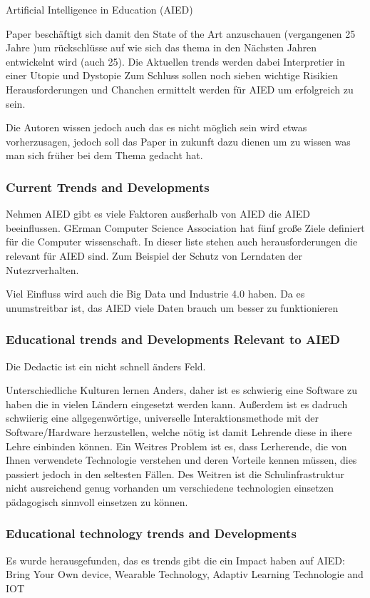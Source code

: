 Artificial Intelligence in Education (AIED)

Paper beschäftigt sich damit den State of the Art anzuschauen (vergangenen 25 Jahre )um rückschlüsse auf wie sich das
thema in den Nächsten Jahren entwickelnt wird (auch 25). Die Aktuellen trends werden dabei Interpretier in einer Utopie und Dystopie
Zum Schluss sollen noch sieben wichtige Risikien Herausforderungen und Chanchen ermittelt werden für AIED um erfolgreich zu sein.

Die Autoren wissen jedoch auch das es nicht möglich sein wird etwas vorherzusagen, jedoch soll das Paper in zukunft dazu dienen um zu wissen was man sich früher bei dem Thema gedacht hat.


\subsubsection*{Current Trends and Developments}

Nehmen AIED gibt es viele Faktoren ausßerhalb von AIED die AIED beeinflussen.
GErman Computer Science Association hat fünf große Ziele definiert für die Computer wissenschaft. In dieser
liste stehen auch herausforderungen die relevant für AIED sind. Zum Beispiel der Schutz von Lerndaten der Nutezrverhalten.

Viel Einfluss wird auch die Big Data und Industrie 4.0 haben. Da es unumstreitbar ist, das AIED viele Daten brauch um besser zu funktionieren

\subsubsection{Educational trends and Developments Relevant to AIED}
Die Dedactic ist ein nicht schnell änders Feld.

Unterschiedliche Kulturen lernen Anders, daher ist es schwierig eine Software zu haben die in vielen Ländern eingesetzt werden kann.
Außerdem ist es dadruch schwiierig eine allgegenwörtige, universelle Interaktionsmethode mit der Software/Hardware herzustellen,
welche nötig ist damit Lehrende diese in ihere Lehre einbinden können. 
Ein Weitres Problem ist es, dass Lerherende, die von Ihnen verwendete Technologie verstehen und deren Vorteile kennen müssen,
dies passiert jedoch in den seltesten Fällen. Des Weitren ist die Schulinfrastruktur nicht ausreichend genug vorhanden um verschiedene technologien einsetzen pädagogisch sinnvoll einsetzen zu können.


\subsubsection{Educational technology trends and Developments}
Es wurde herausgefunden, das es trends gibt die ein Impact haben auf AIED: Bring Your Own device, Wearable Technology, Adaptiv Learning Technologie and IOT

